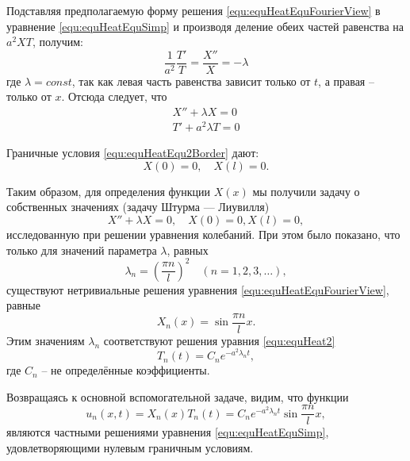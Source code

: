 Подставляя предполагаемую форму решения \eqref{equ:equHeatEquFourierView} в уравнение \eqref{equ:equHeatEquSimp}  и производя деление обеих частей равенства на $a^2 X T$, получим: 
\begin{equation}
	\frac{1}{a^2} \frac{T'}{T} = \frac{X''}{X} = - \lambda
	\label{equ:equHeatEquFourierView}
\end{equation}
где $\lambda = const$, так как левая часть равенства зависит только от $t$, а правая -- только от $x$.
Отсюда следует, что
\begin{gather}
	X'' + \lambda X = 0
	\label{equ:equHeat1}\\
	T' + a^2 \lambda T = 0
	\label{equ:equHeat2}
\end{gather}

Граничные условия \eqref{equ:equHeatEqu2Border} дают:\\
\begin{equation}
	X(0) = 0, \quad X(l) = 0.
	\label{equ:equHeat3}
\end{equation}

Таким образом, для определения функции $X(x)$ мы получили задачу о собственных значениях (задачу Штурма --- Лиувилля)
\begin{equation}
	X'' + \lambda X =0, \quad X(0) = 0, X(l) = 0,
	\label{equ:equHeatShturm}
\end{equation}
исследованную при решении уравнения колебаний. При этом было показано, что только для значений параметра $\lambda$, равных 
\[
	\lambda_n = \left(\frac{\pi n}{l} \right)^2 \quad (n = 1, 2, 3, \ldots),
\]
существуют нетривиальные решения уравнения \eqref{equ:equHeatEquFourierView}, равные
\begin{equation}
	X_n(x) = \sin \frac{\pi n}{l} x.
	\label{equ:equHeat4}
\end{equation}
Этим значениям $\lambda_n$ соответствуют решения уравния \eqref{equ:equHeat2}
\[
	T_n(t) = C_n e^{-a^2 \lambda_n t},
\]
где $C_n$ -- не определённые коэффициенты.

Возвращаясь к основной вспомогательной задаче, видим, что функции
\[
	u_n(x, t) = X_n(x) T_n(t) = C_n e^{-a^2 \lambda_n t} \sin \frac{\pi n}{l} x,
\]
являются частными решениями уравнения \eqref{equ:equHeatEquSimp}, удовлетворяющими нулевым граничным условиям. \\


